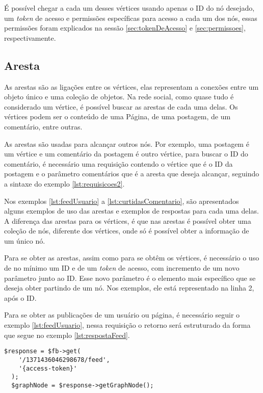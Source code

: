 É possível chegar a cada um desses vértices usando apenas o ID do nó desejado, um \textit{token} de acesso e permissões específicas para acesso a cada um dos nós, essas permissões foram explicados na sessão \ref{sec:tokenDeAcesso} e \ref{sec:permissoes}, respectivamente.

\subsection{Aresta}
As arestas são as ligações entre os vértices, elas representam a conexões entre um objeto único e uma coleção de objetos. Na rede social, como quase tudo é considerado um vértice, é possível buscar as arestas de cada uma delas. Os vértices podem ser o conteúdo de uma Página, de uma postagem, de um comentário, entre outras.

As arestas são usadas para alcançar outros nós. Por exemplo, uma postagem é um vértice e um comentário da postagem é outro vértice, para buscar o ID do comentário, é necessário uma requisição contendo o vértice que é o ID da postagem e o parâmetro comentários que é a aresta que deseja alcançar, seguindo a sintaxe do exemplo \ref{lst:requisicoes2}.

Nos exemplos \ref{lst:feedUsuario} a \ref{lst:curtidasComentario}, são apresentados alguns exemplos de uso das arestas e exemplos de respostas para cada uma delas. A diferença das arestas para os vértices, é que nas arestas é possível obter uma coleção de nós, diferente dos vértices, onde só é possível obter a informação de um único nó.

Para se obter as arestas, assim como para se obtêm os vértices, é necessário o uso de no mínimo um ID e de um \textit{token} de acesso, com incremento de um novo parâmetro junto ao ID. Esse novo parâmetro é o elemento mais específico que se deseja obter partindo de um nó. Nos exemplos, ele está representado na linha 2, após o ID.

Para se obter as publicações de um usuário ou página, é necessário seguir o exemplo \ref{lst:feedUsuario}, nessa requisição o retorno será estruturado da forma que segue no exemplo \ref{lst:respostaFeed}.

\begin{lstlisting}[caption={Requisitando todas as publicações de um usuário},label={lst:feedUsuario}]
  $response = $fb->get( 
    '/1371436046298678/feed', 
    '{access-token}'
  );
  $graphNode = $response->getGraphNode();
\end{lstlisting}

